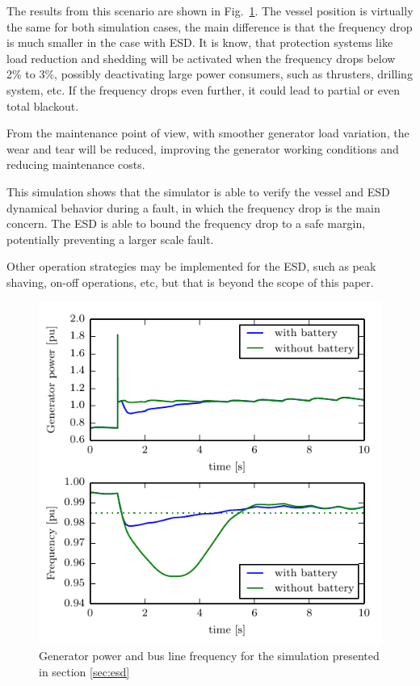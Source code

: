 \documentclass[journal]{IEEEtran}
\begin{document}
The results from this scenario are shown in Fig.~\ref{fig:esdCase}. The vessel position is virtually the same for both simulation cases, the main difference is that the frequency drop is much smaller in the case with \ac{ESD}. It is know, that protection systems like load reduction and shedding will be activated when the frequency drops below 2\% to 3\%, possibly deactivating large power consumers, such as thrusters, drilling system, etc. If the frequency drops even further, it could lead to partial or even total blackout.

From the maintenance point of view, with smoother generator load variation, the wear and tear will be reduced, improving the generator working conditions and reducing maintenance costs.

This simulation shows that the simulator is able to verify the vessel and \ac{ESD} dynamical behavior during a fault, in which the frequency drop is the main concern. The \ac{ESD} is able to bound the frequency drop to a safe margin, potentially preventing a larger scale fault.

Other operation strategies may be implemented for the \ac{ESD}, such as peak shaving, on-off operations, etc, but that is beyond the scope of this paper.

\begin{figure} %
\includegraphics[width=\columnwidth]{figures/esdCase}
\caption{Generator power and bus line frequency for the simulation presented in section \ref{sec:esd}}
\label{fig:esdCase}
\end{figure}
\end{document}
